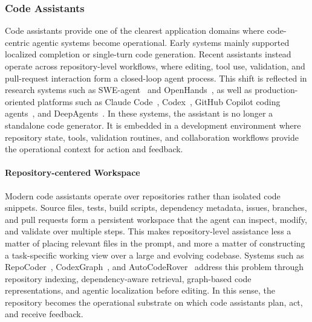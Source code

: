 \subsubsection{Code Assistants}
Code assistants provide one of the clearest application domains where
code-centric agentic systems become operational. Early systems mainly supported
localized completion or single-turn code generation. Recent assistants instead
operate across repository-level workflows, where editing, tool use, validation,
and pull-request interaction form a closed-loop agent process. This shift is
reflected in research systems such as SWE-agent~\citep{yang2024swe} and
OpenHands~\citep{wang2024openhands}, as well as production-oriented platforms
such as Claude Code~\citep{claudecode2025}, Codex~\citep{codex2025}, GitHub
Copilot coding agents~\citep{copilotagent2025}, and
DeepAgents~\citep{deepagents2025}. In these systems, the assistant is no longer
a standalone code generator. It is embedded in a development environment where
repository state, tools, validation routines, and collaboration workflows
provide the operational context for action and feedback.

\paragraph{Repository-centered Workspace}
Modern code assistants operate over repositories rather than isolated code
snippets. Source files, tests, build scripts, dependency metadata, issues,
branches, and pull requests form a persistent workspace that the agent can
inspect, modify, and validate over multiple steps. This makes repository-level
assistance less a matter of placing relevant files in the prompt, and more a
matter of constructing a task-specific working view over a large and evolving
codebase. Systems such as RepoCoder~\cite{zhang2023repocoder}, CodexGraph~\cite{liu2024codexgraphbridginglargelanguage}, and AutoCodeRover~\cite{zhang2024autocoderover} address this
problem through repository indexing, dependency-aware retrieval, graph-based
code representations, and agentic localization before editing. In this sense, the repository
becomes the operational substrate on which code assistants plan, act, and
receive feedback.

